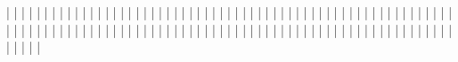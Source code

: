   |                      |
  |                      |
  |                      |
  |                      |
  |                      |
  |                      |
  |                      |
  |                      |
  |                      |
  |                      |
  |                      |
  |                      |
  |                      |
  |                      |
  |                      |
  |                      |
  |                      |
  |                      |
  |                      |
  |                      |
  |                      |
  |                      |
  |                      |
  |                      |
  |                      |
  |                      |
  |                      |
  |                      |
  |                      |
  |                      |
  |                      |
  |                      |
  |                      |
  |                      |
  |                      |
  |                      |
  |                      |
  |                      |
  |                      |
  |                      |
  |                      |
  |                      |
  |                      |
  |                      |
  |                      |
  |                      |
  |                      |
  |                      |
  |                      |
  |                      |
  |                      |
  |                      |
  |                      |
  |                      |
  |                      |
  |                      |
  |                      |
  |                      |
  |                      |
  |                      |
  |                      |
  |